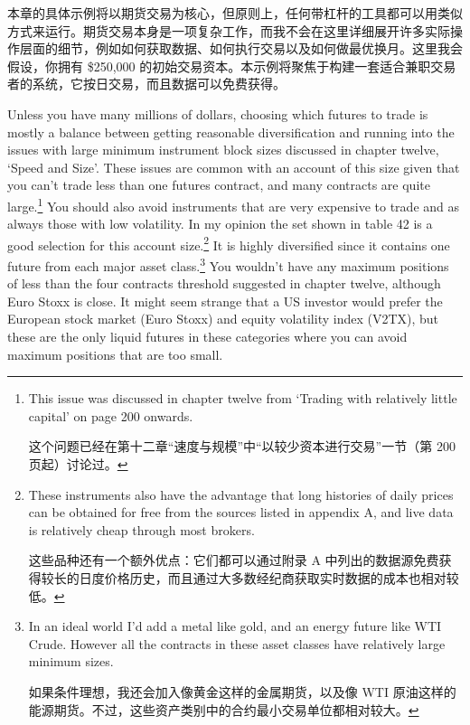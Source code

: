 \begin{chineseblock}本章的具体示例将以期货交易为核心，但原则上，任何带杠杆的工具都可以用类似方式来运行。期货交易本身是一项复杂工作，而我不会在这里详细展开许多实际操作层面的细节，例如如何获取数据、如何执行交易以及如何做最优换月。这里我会假设，你拥有 \$250,000 的初始交易资本。本示例将聚焦于构建一套适合兼职交易者的系统，它按日交易，而且数据可以免费获得。\end{chineseblock}



\begin{englishblock} Unless you have many millions of dollars, choosing which futures to trade is mostly a balance between getting reasonable diversification and running into the issues with large minimum instrument block sizes discussed in chapter twelve, ‘Speed and Size'. These issues are common with an account of this size given that you can't trade less than one futures contract, and many contracts are quite large.\footnote{This issue was discussed in chapter twelve from ‘Trading with relatively little capital' on page 200 onwards. \par 这个问题已经在第十二章“速度与规模”中“以较少资本进行交易”一节（第 200 页起）讨论过。} You should also avoid instruments that are very expensive to trade and as always those with low volatility. In my opinion the set shown in table 42 is a good selection for this account size.\footnote{These instruments also have the advantage that long histories of daily prices can be obtained for free from the sources listed in appendix A, and live data is relatively cheap through most brokers. \par 这些品种还有一个额外优点：它们都可以通过附录 A 中列出的数据源免费获得较长的日度价格历史，而且通过大多数经纪商获取实时数据的成本也相对较低。} It is highly diversified since it contains one future from each major asset class.\footnote{In an ideal world I'd add a metal like gold, and an energy future like WTI Crude. However all the contracts in these asset classes have relatively large minimum sizes. \par 如果条件理想，我还会加入像黄金这样的金属期货，以及像 WTI 原油这样的能源期货。不过，这些资产类别中的合约最小交易单位都相对较大。} You wouldn't have any maximum positions of less than the four contracts threshold suggested in chapter twelve, although Euro Stoxx is close. It might seem strange that a US investor would prefer the European stock market (Euro Stoxx) and equity volatility index (V2TX), but these are the only liquid futures in these categories where you can avoid maximum positions that are too small. \end{englishblock}

